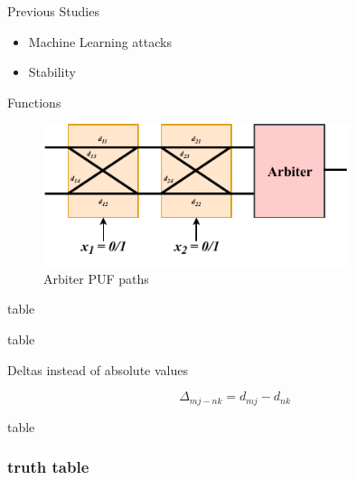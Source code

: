\documentclass[10pt, compress]{beamer}
\begin{document}
\begin{frame}{Previous Studies}
	\begin{itemize}
		\item Machine Learning attacks
        \item Stability
	\end{itemize}
\end{frame}


\begin{frame}{Functions}
    \begin{figure}
        \centering
        \includegraphics[width=0.8\textwidth]{figures/2_switch_blocks_paths.pdf}
        \caption{Arbiter PUF paths}
    \end{figure}
\end{frame}


\begin{frame}{table}

  
  
\end{frame}


\begin{frame}{table}

    \begin{center}
        Deltas instead of absolute values
    \end{center}
    \[ \Delta_{mj-nk} = d_{mj} - d_{nk} \]

\end{frame}


\begin{frame}{table}

  
  
\end{frame}


\begin{frame}[fragile]
  \frametitle{truth table}
  
  
  
\end{frame}
\end{document}
